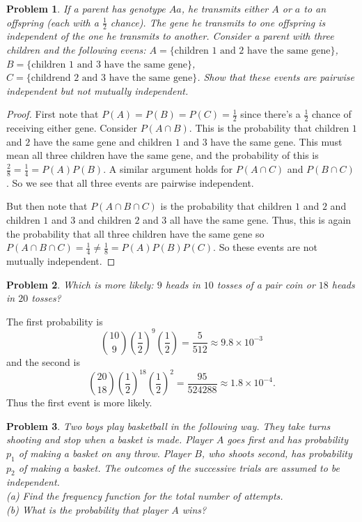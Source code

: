 \documentclass{article}
\newtheorem{problem}{Problem}
\begin{document}
\begin{problem}
If a parent has genotype $Aa$, he transmits either $A$ or $a$ to an offspring (each with a $\frac{1}{2}$ chance). The gene he transmits to one offspring is independent of the one he transmits to another. Consider a parent with three children and the following evens: $A = \{\text{children $1$ and $2$ have the same gene}\}$, $B = \{\text{children $1$ and $3$ have the same gene}\}$, $C = \{\text{childrend $2$ and $3$ have the same gene}\}$. Show that these events are pairwise independent but not mutually independent.
\end{problem}
\begin{proof}
First note that $P(A) = P(B) = P(C) = \frac{1}{2}$ since there's a $\frac{1}{2}$ chance of receiving either gene. Consider $P(A \cap B)$. This is the probability that children $1$ and $2$ have the same gene and children $1$ and $3$ have the same gene. This must mean all three children have the same gene, and the probability of this is $\frac{2}{8} = \frac{1}{4} = P(A)P(B)$. A similar argument holds for $P(A \cap C)$ and $P(B \cap C)$. So we see that all three events are pairwise independent.

But then note that $P(A \cap B \cap C)$ is the probability that children $1$ and $2$ and children $1$ and $3$ and children $2$ and $3$ all have the same gene. Thus, this is again the probability that all three children have the same gene so $P(A \cap B \cap C) = \frac{1}{4} \neq \frac{1}{8} = P(A)P(B)P(C)$. So these events are not mutually independent.
\end{proof}

\begin{problem}
Which is more likely: $9$ heads in $10$ tosses of a pair coin or $18$ heads in $20$ tosses?
\end{problem}

The first probability is
\[
\binom{10}{9} \left ( \frac{1}{2} \right )^9 \left ( \frac{1}{2} \right ) = \frac{5}{512} \approx 9.8 \times 10^{-3}
\]
and the second is
\[
\binom{20}{18} \left ( \frac{1}{2} \right )^{18} \left ( \frac{1}{2} \right )^2 = \frac{95}{524288} \approx 1.8 \times 10^{-4}.
\]
Thus the first event is more likely.

\begin{problem}
Two boys play basketball in the following way. They take turns shooting and stop when a basket is made. Player $A$ goes first and has probability $p_1$ of making a basket on any throw. Player $B$, who shoots second, has probability $p_2$ of making a basket. The outcomes of the successive trials are assumed to be independent.\\
(a) Find the frequency function for the total number of attempts.\\
(b) What is the probability that player $A$ wins?\\
\end{problem}
\end{document}
